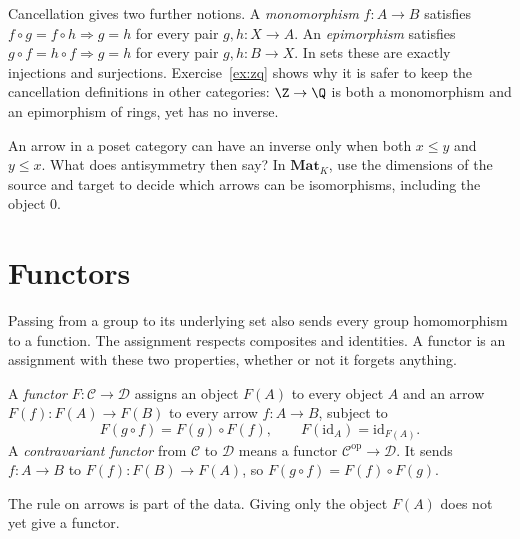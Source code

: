 Cancellation gives two further notions. A \emph{monomorphism} $f:A\to B$ satisfies $f\circ g=f\circ h\Rightarrow g=h$ for every pair $g,h:X\to A$. An \emph{epimorphism} satisfies $g\circ f=h\circ f\Rightarrow g=h$ for every pair $g,h:B\to X$. In sets these are exactly injections and surjections. Exercise~\ref{ex:zq} shows why it is safer to keep the cancellation definitions in other categories: $\Z\to\Q$ is both a monomorphism and an epimorphism of rings, yet has no inverse.

\begin{think}
An arrow in a poset category can have an inverse only when both $x\le y$ and $y\le x$. What does antisymmetry then say? In $\mathbf{Mat}_K$, use the dimensions of the source and target to decide which arrows can be isomorphisms, including the object $0$.
\end{think}

\section{Functors}

Passing from a group to its underlying set also sends every group homomorphism to a function. The assignment respects composites and identities. A functor is an assignment with these two properties, whether or not it forgets anything.

\begin{definition}\label{def:functor}
A \emph{functor} $F:\mathcal C\to\mathcal D$ assigns an object $F(A)$ to every object $A$ and an arrow $F(f):F(A)\to F(B)$ to every arrow $f:A\to B$, subject to
\[
F(g\circ f)=F(g)\circ F(f),\qquad F(\mathrm{id}_A)=\mathrm{id}_{F(A)}.
\]
A \emph{contravariant functor} from $\mathcal C$ to $\mathcal D$ means a functor $\mathcal C^{\mathrm{op}}\to\mathcal D$. It sends $f:A\to B$ to $F(f):F(B)\to F(A)$, so
$F(g\circ f)=F(f)\circ F(g)$.
\end{definition}

The rule on arrows is part of the data. Giving only the object $F(A)$ does not yet give a functor.

